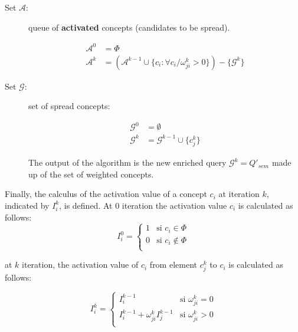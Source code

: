 \begin{description}

\item [Set $\mathcal{A}$:] queue of {\bf activated} concepts (candidates to be
spread).

\begin{align}
 \mathcal{A}^0 &=\Phi \\
 \mathcal{A}^k &=(\mathcal{A}^{k-1} \cup \{c_i: {\forall c_i /  \omega_{ji}^k
>0}\})-{ \{\mathcal{G}^k}\}
\end{align}

\item [Set $\mathcal{G}$:] set of spread concepts:

\begin{align}
 \mathcal{G}^0 &=\emptyset \\
 \mathcal{G}^k &= \mathcal{G}^{k-1} \cup \{c_j^k\}
\end{align}

The output of the algorithm is the new enriched query $\mathcal{G}^k = Q'_{sem}$
made up of the set of weighted concepts.

\end{description}

Finally, the calculus of the activation value of a concept $c_i$
at iteration $k$, indicated by $I^k_i$, is defined. At $0$ iteration the
activation value $c_i$ is calculated as follows:
\begin{equation}
I^0_i=\begin{cases}%
  1 & \text{si $c_i \in \Phi$} \\%
  0 & \text{si $c_i \notin \Phi$} \\%
 \end{cases}
\end{equation}

at $k$ iteration, the activation value of $c_i$ from element
$c_j^{k}$ to $c_i$ is calculated as follows:

\begin{equation}
I^k_i=\begin{cases}%
  I^{k-1}_i & \text{si } \omega_{ji}^k = 0 \\%
  I^{k-1}_i + \omega_{ji}^k I^{k-1}_j  & \text{si }  \omega_{ji}^k > 0  \\%
 \end{cases}
\end{equation}


